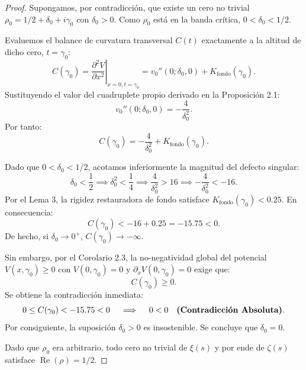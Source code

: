 \documentclass[11pt,a4paper]{article}
\theoremstyle{definition}
\theoremstyle{remark}
\begin{document}
\begin{proof}
Supongamos, por contradicción, que existe un cero no trivial $\rho_0 = 1/2 + \delta_0 + i\gamma_0$ con $\delta_0 > 0$. Como $\rho_0$ está en la banda crítica, $0 < \delta_0 < 1/2$.

Evaluemos el balance de curvatura transversal $C(t)$ exactamente a la altitud de dicho cero, $t = \gamma_0$:
\begin{equation}
C(\gamma_0) = \left. \frac{\partial^2 V}{\partial x^2} \right|_{x=0, t=\gamma_0} = v_0''(0; \delta_0, 0) + K_{\text{fondo}}(\gamma_0).
\end{equation}
Sustituyendo el valor del cuadruplete propio derivado en la Proposición 2.1:
\begin{equation}
v_0''(0; \delta_0, 0) = -\frac{4}{\delta_0^2}.
\end{equation}
Por tanto:
\begin{equation}
C(\gamma_0) = -\frac{4}{\delta_0^2} + K_{\text{fondo}}(\gamma_0).
\end{equation}

Dado que $0 < \delta_0 < 1/2$, acotamos inferiormente la magnitud del defecto singular:
\begin{equation}
\delta_0 < \frac{1}{2} \implies \delta_0^2 < \frac{1}{4} \implies \frac{4}{\delta_0^2} > 16 \implies -\frac{4}{\delta_0^2} < -16.
\end{equation}
Por el Lema 3, la rigidez restauradora de fondo satisface $K_{\text{fondo}}(\gamma_0) < 0.25$. En consecuencia:
\begin{equation}
C(\gamma_0) < -16 + 0.25 = -15.75 < 0.
\end{equation}
De hecho, si $\delta_0 \to 0^+$, $C(\gamma_0) \to -\infty$.

Sin embargo, por el Corolario 2.3, la no-negatividad global del potencial $V(x, \gamma_0) \ge 0$ con $V(0, \gamma_0) = 0$ y $\partial_x V(0, \gamma_0) = 0$ exige que:
\begin{equation}
C(\gamma_0) \ge 0.
\end{equation}
Se obtiene la contradicción inmediata:
\begin{equation}
0 \le C(\gamma_0) < -15.75 < 0 \quad \implies \quad 0 < 0 \quad \text{\textbf{(Contradicción Absoluta)}}.
\end{equation}
Por consiguiente, la suposición $\delta_0 > 0$ es insostenible. Se concluye que $\delta_0 = 0$.

Dado que $\rho_0$ era arbitrario, todo cero no trivial de $\xi(s)$ y por ende de $\zeta(s)$ satisface $\operatorname{Re}(\rho) = 1/2$.
\end{proof}
\end{document}

